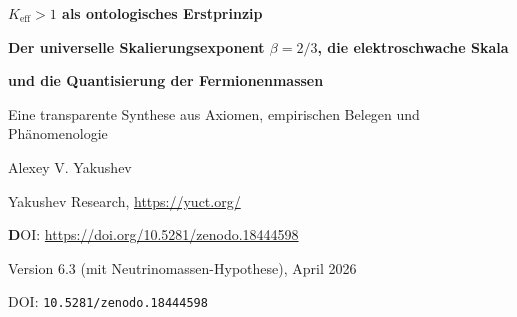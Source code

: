 \documentclass[12pt,a4paper]{article}
\begin{document}
	
	\begin{titlepage}
		\centering
		\vspace*{1cm}
		
		{\Huge\bfseries \(K_{\mathrm{eff}} > 1\) als ontologisches Erstprinzip\par}
		\vspace{0.3cm}
		{\Large\bfseries Der universelle Skalierungsexponent \(\beta = 2/3\), die elektroschwache Skala\par}
		\vspace{0.1cm}
		{\Large\bfseries und die Quantisierung der Fermionenmassen\par}
		\vspace{0.5cm}
		{\large Eine transparente Synthese aus Axiomen, empirischen Belegen und Phänomenologie\par}
		
		\vspace{1cm}
		
		{\large Alexey V. Yakushev\par}
		\vspace{0.3cm}
		{\normalsize Yakushev Research, \url{https://yuct.org/}\par}
		
		\vspace{0.5cm}
		{\sffamily\footnotesize \textbf DOI: \url{https://doi.org/10.5281/zenodo.18444598}}%
		
		\vspace{1.0cm}
		
		{\normalsize Version 6.3 (mit Neutrinomassen-Hypothese), April 2026\par}
		\vspace{0.3cm}
		{\normalsize DOI: \texttt{10.5281/zenodo.18444598}\par}
		
		\vfill
		

\end{titlepage}
\end{document}
